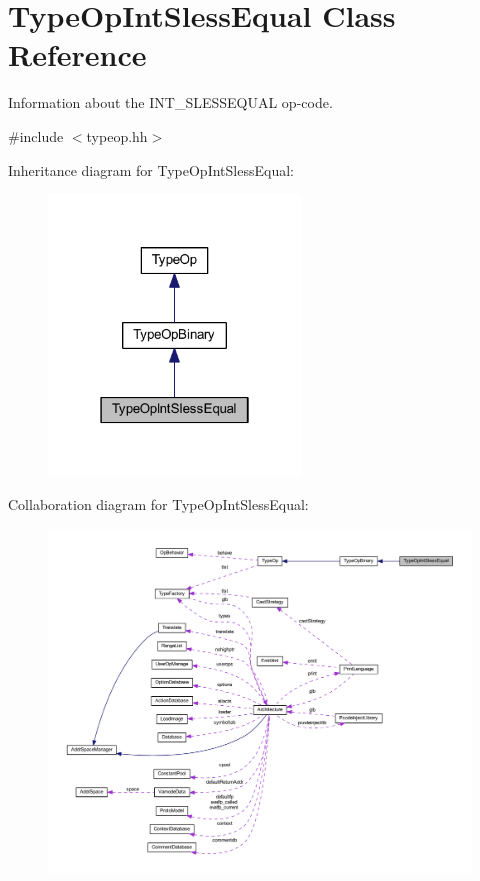 \hypertarget{class_type_op_int_sless_equal}{}\section{Type\+Op\+Int\+Sless\+Equal Class Reference}
\label{class_type_op_int_sless_equal}


Information about the I\+N\+T\+\_\+\+S\+L\+E\+S\+S\+E\+Q\+U\+AL op-\/code.  




{\ttfamily \#include $<$typeop.\+hh$>$}



Inheritance diagram for Type\+Op\+Int\+Sless\+Equal\+:
\nopagebreak
\begin{figure}[H]
\begin{center}
\leavevmode
\includegraphics[width=190pt]{class_type_op_int_sless_equal__inherit__graph}
\end{center}
\end{figure}


Collaboration diagram for Type\+Op\+Int\+Sless\+Equal\+:
\nopagebreak
\begin{figure}[H]
\begin{center}
\leavevmode
\includegraphics[width=350pt]{class_type_op_int_sless_equal__coll__graph}
\end{center}
\end{figure}
